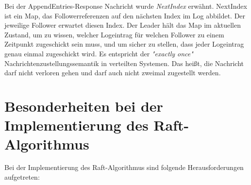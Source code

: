 Bei der AppendEntries-Response Nachricht wurde \textit{NextIndex} erwähnt. NextIndex ist ein Map, das Followerreferenzen auf den nächsten Index im Log abbildet. Der jeweilige Follower erwartet diesen Index. Der Leader hält das Map im aktuellen Zustand, um zu wissen, welcher Logeintrag für welchen Follower zu einem Zeitpunkt zugeschickt sein muss, und um sicher zu stellen, dass jeder Logeintrag genau einmal zugeschickt wird. Es entspricht der \textit{"exactly once"} Nachrichtenzustellungssemantik in verteilten Systemen. Das heißt, die Nachricht darf nicht verloren gehen und darf auch nicht zweimal zugestellt werden.

\section{Besonderheiten bei der Implementierung des Raft-Algorithmus}

Bei der Implementierung des Raft-Algorithmus sind folgende Herausforderungen aufgetreten:

